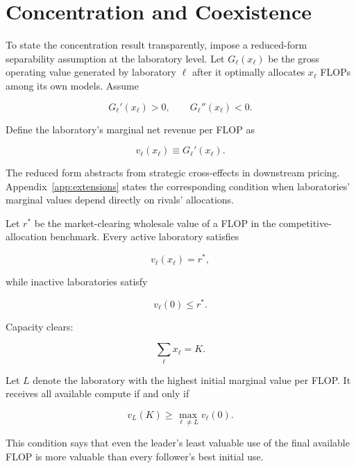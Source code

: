 \documentclass[11pt]{article}
\begin{document}
\section{Concentration and Coexistence}
\label{sec:concentration}

To state the concentration result transparently, impose a reduced-form separability assumption at the laboratory level. Let $G_\ell(x_\ell)$ be the gross operating value generated by laboratory $\ell$ after it optimally allocates $x_\ell$ FLOPs among its own models. Assume

\begin{equation}G_\ell'(x_\ell)>0,\qquad G_\ell''(x_\ell)<0.\end{equation}

Define the laboratory's marginal net revenue per FLOP as

\begin{equation}v_\ell(x_\ell)\equiv G_\ell'(x_\ell).\end{equation}

The reduced form abstracts from strategic cross-effects in downstream pricing. Appendix~\ref{app:extensions} states the corresponding condition when laboratories' marginal values depend directly on rivals' allocations.

Let $r^*$ be the market-clearing wholesale value of a FLOP in the competitive-allocation benchmark. Every active laboratory satisfies

\begin{equation}v_\ell(x_\ell)=r^*,\end{equation}

while inactive laboratories satisfy

\begin{equation}v_\ell(0)\leq r^*.\end{equation}

Capacity clears:

\begin{equation}\sum_\ell x_\ell=K.\end{equation}

Let $L$ denote the laboratory with the highest initial marginal value per FLOP. It receives all available compute if and only if

\begin{equation}\boxed{v_L(K)\geq\max_{\ell\neq L}v_\ell(0).}\end{equation}

This condition says that even the leader's least valuable use of the final available FLOP is more valuable than every follower's best initial use.
\end{document}
